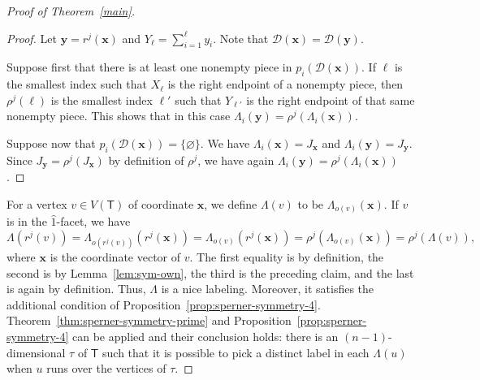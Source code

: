 \documentclass[12pt]{amsart}
\theoremstyle{definition}
\theoremstyle{remark}
\def\D{\mathcal{D}}
\def\T{\mathsf{T}}
\def\xx{\boldsymbol{x}}
\def\yy{\boldsymbol{y}}
\begin{document}
\begin{proof}[Proof of Theorem~\ref{main}]
\begin{proof}
Let $\yy=r^j(\xx)$ and $Y_{\ell}=\sum_{i=1}^{\ell}y_i$. Note that $\D(\xx)=\D(\yy)$. 

Suppose first that there is at least one nonempty piece in $p_i(\D(\xx))$.
If $\ell$ is the smallest index such that $X_{\ell}$ is the right endpoint of a nonempty piece, then $\rho^j(\ell)$ is the smallest index $\ell'$ such that $Y_{\ell'}$ is the right endpoint of that same nonempty piece. This shows that in this case $\Lambda_i(\yy)=\rho^j\left(\Lambda_i(\xx)\right)$. 

Suppose now that $p_i(\D(\xx))=\{\varnothing\}$. We have $\Lambda_i(\xx)=J_{\xx}$ and $\Lambda_i(\yy)=J_{\yy}$. Since $J_{\yy}=\rho^j(J_{\xx})$ by definition of $\rho^j$, we have again $\Lambda_i(\yy)=\rho^j\left(\Lambda_i(\xx)\right)$.
\end{proof}

%
%



For a vertex $v\in V(\T)$ of coordinate $\xx$, we define $\Lambda(v)$ to be $\Lambda_{o(v)}(\xx)$. %
If $v$ is in the $\widehat{1}$-facet, we have
$$\Lambda(r^j(v))=\Lambda_{o(r^j(v))}(r^j(\xx))=\Lambda_{o(v)}(r^j(\xx))=\rho^j\left(\Lambda_{o(v)}(\xx)\right)=\rho^j\left(\Lambda(v)\right),$$
where $\xx$ is the coordinate vector of $v$. The first equality is by definition, the second is by Lemma~\ref{lem:sym-own}, the third is the preceding claim, and the last is again by definition.
 Thus, $\Lambda$ is a nice labeling. Moreover, it satisfies the additional condition of Proposition~\ref{prop:sperner-symmetry-4}. Theorem~\ref{thm:sperner-symmetry-prime} and Proposition~\ref{prop:sperner-symmetry-4} can be applied and their conclusion holds: there is an $(n-1)$-dimensional $\tau$ of $\T$ such that it is possible to pick a distinct label in each $\Lambda(u)$ when $u$ runs over the vertices of $\tau$.


\end{proof}
\end{document}
